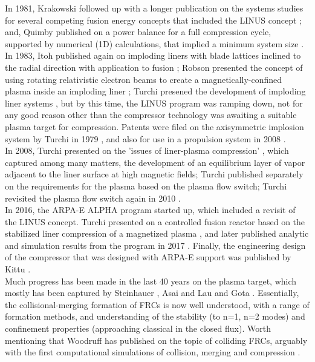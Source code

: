 In 1981, Krakowski followed up with a longer publication on the systems studies for several competing fusion energy concepts that included the LINUS concept \cite{Krakowski1981}; and, Quimby published on a power balance for a full compression cycle, supported by numerical (1D) calculations, that implied a minimum system size \cite{Quimby1981}.\\

In 1983, Itoh published again on imploding liners with blade lattices inclined to the radial direction with application to fusion \cite{Itoh1983}; Robson presented the concept of using rotating relativistic electron beams to create a magnetically-confined plasma inside an imploding liner \cite{Robson1983}; Turchi presened the development of imploding liner systems \cite{Turchi1983}, but by this time, the LINUS program was ramping down, not for any good reason other than the compressor technology was awaiting a suitable plasma target for compression.  Patents were filed on the axisymmetric implosion system by Turchi in 1979 \cite{Turchipat1}, and also for use in a propulsion system in 2008 \cite{Turchipat2}.\\

In 2008, Turchi presented on the 'issues of liner-plasma compression' \cite{Turchi2008}, which captured among many matters, the development of an equilibrium layer of vapor adjacent to the liner surface at high magnetic fields; Turchi published separately on the requirements for the plasma \cite{Turchi2008a} based on the plasma flow switch;  Turchi revisited the plasma flow switch again in 2010 \cite{Turchi2010}.\\

In 2016, the ARPA-E ALPHA program started up, which included a revisit of the LINUS concept.  Turchi presented on a controlled fusion reactor based on the stabilized liner compression of a magnetized plasma \cite{Turchi2016a}, and later published analytic and simulation results from the program in 2017 \cite{Turchi2017}.  Finally, the engineering design of the compressor that was designed with ARPA-E support was published by Kittu \cite{Kiuttu2018}.\\

Much progress has been made in the last 40 years on the plasma target, which mostly has been captured by Steinhauer \cite{Steinhauer2011} \cite{Steinhauer2018}, Asai \cite{Asai2019} and Lau \cite{Lau2019} and Gota \cite{Gota2019}.  Essentially, the collisional-merging formation of FRCs is now well understood, with a range of formation methods, and understanding of the stability (to n=1, n=2 modes) and confinement properties (approaching classical in the closed flux).  Worth mentioning that Woodruff has published on the topic of colliding FRCs, arguably with the first computational simulations of collision, merging and compression \cite{Woodruff2007a} \cite{Woodruff2008/06/b}.



